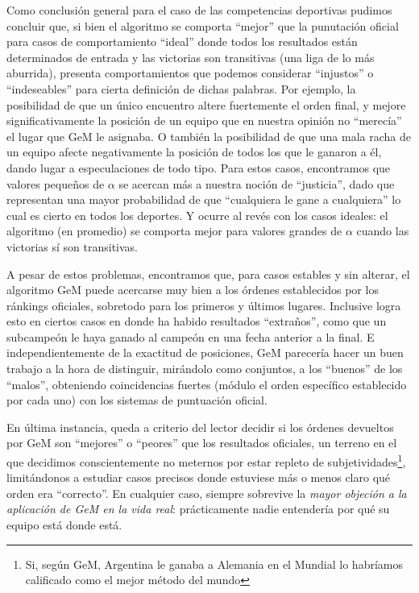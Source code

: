 Como conclusión general para el caso de las competencias deportivas pudimos concluir que, si bien el algoritmo se comporta ``mejor'' que la punutación oficial para casos de comportamiento ``ideal'' donde todos los resultados están determinados de entrada y las victorias son transitivas (una liga de lo más aburrida), presenta comportamientos que podemos considerar ``injustos'' o ``indeseables'' para cierta definición de dichas palabras. Por ejemplo, la posibilidad de que un único encuentro altere fuertemente el orden final, y mejore significativamente la posición de un equipo que en nuestra opinión no ``merecía'' el lugar que GeM le asignaba. O también la posibilidad de que una mala racha de un equipo afecte negativamente la posición de todos los que le ganaron a él, dando lugar a especulaciones de todo tipo. Para estos casos, encontramos que valores pequeños de $\alpha$ se acercan más a nuestra noción de ``justicia'', dado que representan una mayor probabilidad de que ``cualquiera le gane a cualquiera'' lo cual es cierto en todos los deportes. Y ocurre al revés con los casos ideales: el algoritmo (en promedio) se comporta mejor para valores grandes de $\alpha$ cuando las victorias sí son transitivas.

A pesar de estos problemas, encontramos que, para casos estables y sin alterar, el algoritmo GeM puede acercarse muy bien a los órdenes establecidos por los ránkings oficiales, sobretodo para los primeros y últimos lugares. Inclusive logra esto en ciertos casos en donde ha habido resultados ``extraños'', como que un subcampeón le haya ganado al campeón en una fecha anterior a la final. E independientemente de la exactitud de posiciones, GeM parecería hacer un buen trabajo a la hora de distinguir, mirándolo como conjuntos, a los ``buenos'' de los ``malos'', obteniendo coincidencias fuertes (módulo el orden específico establecido por cada uno) con los sistemas de puntuación oficial.

En última instancia, queda a criterio del lector decidir si los órdenes devueltos por GeM son ``mejores'' o ``peores'' que los resultados oficiales, un terreno en el que decidimos conscientemente no meternos por estar repleto de subjetividades\footnote{Si, según GeM, Argentina le ganaba a Alemania en el Mundial lo habríamos calificado como el mejor método del mundo}, limitándonos a estudiar casos precisos donde estuviese más o menos claro qué orden era ``correcto''. En cualquier caso, siempre sobrevive la \emph{mayor objeción a la aplicación de GeM en la vida real}: prácticamente nadie entendería por qué su equipo está donde está.